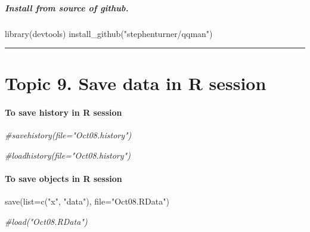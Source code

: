\documentclass[
]{article}
\newenvironment{Shaded}{\begin{snugshade}}{\end{snugshade}}
\newcommand{\AttributeTok}[1]{\textcolor[rgb]{0.77,0.63,0.00}{#1}}
\newcommand{\CommentTok}[1]{\textcolor[rgb]{0.56,0.35,0.01}{\textit{#1}}}
\newcommand{\FunctionTok}[1]{\textcolor[rgb]{0.00,0.00,0.00}{#1}}
\newcommand{\NormalTok}[1]{#1}
\newcommand{\StringTok}[1]{\textcolor[rgb]{0.31,0.60,0.02}{#1}}
\begin{document}
\hypertarget{install-from-source-of-github.}{%
\subparagraph{Install from source of
github.}\label{install-from-source-of-github.}}

\begin{Shaded}
\begin{Highlighting}[]
\FunctionTok{library}\NormalTok{(devtools)}
\FunctionTok{install\_github}\NormalTok{(}\StringTok{"stephenturner/qqman"}\NormalTok{)}
\end{Highlighting}
\end{Shaded}

\begin{center}\rule{0.5\linewidth}{0.5pt}\end{center}

\hypertarget{topic-9.-save-data-in-r-session}{%
\section{Topic 9. Save data in R
session}\label{topic-9.-save-data-in-r-session}}

\hypertarget{to-save-history-in-r-session}{%
\paragraph{To save history in R
session}\label{to-save-history-in-r-session}}

\begin{Shaded}
\begin{Highlighting}[]
\CommentTok{\#savehistory(file="Oct08.history")}

\CommentTok{\#loadhistory(file="Oct08.history")}
\end{Highlighting}
\end{Shaded}

\hypertarget{to-save-objects-in-r-session}{%
\paragraph{To save objects in R
session}\label{to-save-objects-in-r-session}}

\begin{Shaded}
\begin{Highlighting}[]
\FunctionTok{save}\NormalTok{(}\AttributeTok{list=}\FunctionTok{c}\NormalTok{(}\StringTok{"x"}\NormalTok{, }\StringTok{"data"}\NormalTok{), }\AttributeTok{file=}\StringTok{"Oct08.RData"}\NormalTok{)}

\CommentTok{\#load("Oct08.RData")}
\end{Highlighting}
\end{Shaded}
\end{document}
